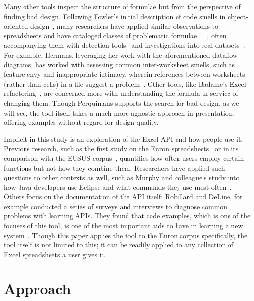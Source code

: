 \documentclass[conference]{IEEEtran}
\newcommand{\toolname}{Perquimans\xspace} \newcommand{\toolnameend}{Perquimans}
\begin{document}
	Many other tools inspect the structure of formulae but from the
	perspective of finding bad design.  Following Fowler's initial description of
	code smells in object-oriented design~\cite{fowler2009refactoring}, many
	researchers have applied similar observations to spreadsheets and have
	cataloged classes of problematic
	formulae~\cite{hermans2012detecting}~\cite{cunha2012towards}~\cite{asavametha2012detecting}, often accompanying them with detection tools~\cite{abreu2014smelling} and investigations into real datasets~\cite{jansen2015code}. For example, Hermans, leveraging her work with the aforementioned dataflow diagrams, has worked with assessing common inter-worksheet smells, such as feature envy and inappropriate intimacy, wherein references between worksheets (rather than cells) in a file suggest a problem~\cite{hermans2012detectinginter}. Other tools, like Badame's Excel refactoring~\cite{badame2012refactoring}, are concerned more with understanding the formula in service of changing them. Though \toolname supports the search for bad design, as we will see, the tool itself takes a much more agnostic approach in presentation, offering examples without regard for design quality. \par

	Implicit in this study is an exploration of the Excel API and how people use
	it. Previous research, such as the first study on the Enron
	spreadsheets~\cite{hermans2015enron} or in its comparison with the EUSUS
	corpus~\cite{jansen2015enron}, quantifies how often users employ certain
	functions but not how they combine them. Researchers have applied such
	questions to other contexts as well, such as Murphy and colleague's study into
	how Java developers use Eclipse and what commands they use most
	often~\cite{murphy2006java}. Others focus on the documentation of the API
	itself: Robillard and DeLine, for example conducted a series of surveys and
	interviews to diagnose common problems with learning APIs. They found that
	code examples, which is one of the focuses of this tool, is one of the most important
	aids to have in learning a new system~\cite{robillard2011field}. Though this
	paper applies the tool to the Enron corpus specifically, the tool itself is not
	limited to this; it can be readily applied to any collection of Excel
	spreadsheets a user gives it.
	
	\section{Approach}
	
\end{document}

